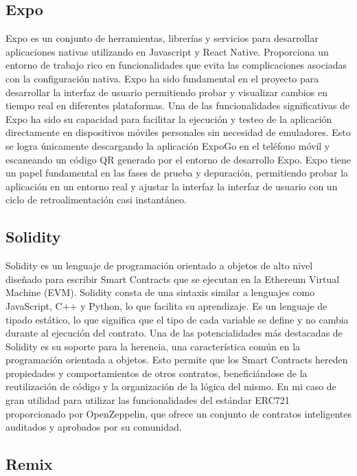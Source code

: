 \subsection{Expo}

Expo es un conjunto de herramientas, librerías y servicios para desarrollar aplicaciones nativas utilizando en Javascript y React Native. Proporciona un entorno de trabajo rico en funcionalidades que evita las complicaciones asociadas con la configuración nativa.
Expo ha sido fundamental en el proyecto para desarrollar la interfaz de usuario permitiendo probar y visualizar cambios en tiempo real en diferentes plataformas.
Una de las funcionalidades significativas de Expo ha sido su capacidad para facilitar la ejecución y testeo de la aplicación directamente en dispositivos móviles personales sin necesidad de emuladores. Esto se logra únicamente descargando la aplicación ExpoGo en el teléfono móvil y escaneando un código QR generado por el entorno de desarrollo Expo.
Expo tiene un papel fundamental en las fases de prueba y depuración, permitiendo probar la aplicación en un entorno real y ajustar la interfaz la interfaz de usuario con un ciclo de retroalimentación casi instantáneo.


\subsection{Solidity}

Solidity es un lenguaje de programación orientado a objetos de alto nivel diseñado para escribir Smart Contracts que se ejecutan en la Ethereum Virtual Machine (EVM). Solidity consta de una sintaxis similar a lenguajes como JavaScript, C++ y Python, lo que facilita su aprendizaje. Es un lenguaje de tipado estático, lo que significa que el tipo de cada variable se define y no cambia durante al ejecución del contrato.
Una de las potencialidades más destacadas de Solidity es su soporte para la herencia, una característica común en la programación orientada a objetos. Esto permite que los Smart Contracts hereden propiedades y comportamientos de otros contratos, beneficiándose de la reutilización de código y la organización de la lógica del mismo. En mi caso de gran utilidad para utilizar las funcionalidades del estándar ERC721 proporcionado por OpenZeppelin, que ofrece un conjunto de contratos inteligentes auditados y aprobados por su comunidad.


\subsection{Remix}

